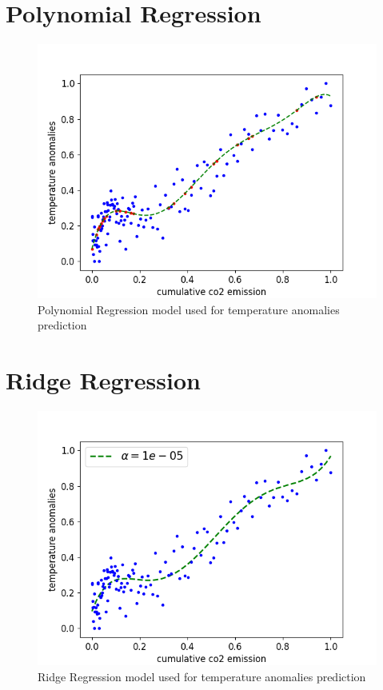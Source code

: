\newpage
\section{Polynomial Regression}

\begin{figure}[h]
  \includegraphics[width=\linewidth]{img/polynomial-regression.png}
  \caption{Polynomial Regression model used for temperature anomalies prediction}
  \label{fig:polynomial-regression}
\end{figure}

\newpage
\section{Ridge Regression}

\begin{figure}[h]
  \includegraphics[width=\linewidth]{img/ridge-regression.png}
  \caption{Ridge Regression model used for temperature anomalies prediction}
  \label{fig:ridge-regression}
\end{figure}

